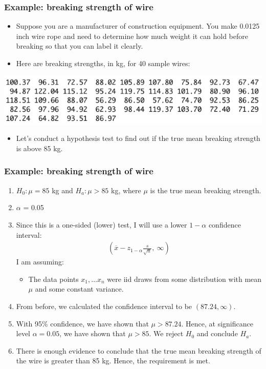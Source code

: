 \documentclass[handout]{beamer}\usepackage[]{graphicx}\usepackage[]{color}
\providecommand{\ov}[1]{\overline{#1}}
\numberwithin{equation}{section}
\begin{document}
\begin{frame}
\frametitle{Example: breaking strength of wire}
\begin{itemize}
\item Suppose you are a manufacturer of construction equipment. You make 0.0125 inch wire rope and need to determine how much weight it can hold before breaking so that you can label it clearly.
\pause \item Here are breaking strengths, in kg, for 40 sample wires:
\end{itemize}
 \includegraphics{../../fig/wiredata.png}
\begin{itemize}
\pause \item Let's conduct a hypothesis test to find out if the true mean breaking strength is above 85 kg.
\end{itemize}
\end{frame}

\begin{frame}
\frametitle{Example: breaking strength of wire} \scriptsize
\begin{enumerate}[1. ]
\item $H_0: \mu = 85$ kg and $H_a: \mu > 85$ kg, where $\mu$ is the true mean breaking strength.
\pause \item $\alpha$ = 0.05
\pause \item Since this is a one-sided (lower) test, I will use a lower $1 - \alpha$ confidence interval:
\begin{align*}
\left (\ov{x} - z_{1 - \alpha} \frac{s}{\sqrt{n}}, \ \infty \right )
\end{align*}
\pause I am assuming:
\begin{itemize}
\pause \item The data points $x_1, \ldots x_n$ were iid draws from some distribution with mean $\mu$ and some constant variance.
\end{itemize}
\pause \item From before, we calculated the confidence interval to be $(87.24, \infty)$.
\pause \item With 95\% confidence, we have shown that $\mu > 87.24$. Hence, at significance level $\alpha = 0.05$, we have shown that $\mu > 85$. We reject $H_0$ and conclude $H_a$.
\pause \item There is enough evidence to conclude that the true mean breaking strength of the wire is greater than 85 kg. Hence, the requirement is met.
\end{enumerate}
\end{frame}
\end{document}
